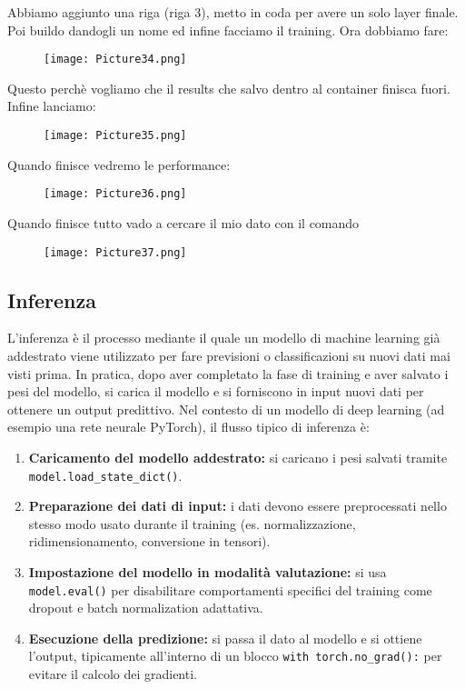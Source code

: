 \documentclass[a4paper,12pt]{article}
\begin{document}
\noindent Abbiamo aggiunto una riga (riga 3), metto in coda per avere un solo layer finale. 
Poi buildo dandogli un nome ed infine facciamo il training. 
\newline
Ora dobbiamo fare:
\begin{figure}[H]
    \centering
    \texttt{[image: Picture34.png]}
\end{figure}
\noindent Questo perchè vogliamo che il results che salvo dentro al container finisca fuori. Infine lanciamo:
\begin{figure}[H]
    \centering
    \texttt{[image: Picture35.png]}
\end{figure}
\noindent Quando finisce vedremo le performance: 
\begin{figure}[H]
    \centering
    \texttt{[image: Picture36.png]}
\end{figure}
Quando finisce tutto vado a cercare il mio dato con il comando 
\begin{figure}[H]
    \centering
    \texttt{[image: Picture37.png]}
\end{figure}

\subsection{Inferenza}
L'inferenza è il processo mediante il quale un modello di machine learning già addestrato viene utilizzato per fare previsioni o classificazioni su nuovi dati mai visti prima. In pratica, dopo aver completato la fase di training e aver salvato i pesi del modello, si carica il modello e si forniscono in input nuovi dati per ottenere un output predittivo.
\newline
Nel contesto di un modello di deep learning (ad esempio una rete neurale PyTorch), il flusso tipico di inferenza è:

\begin{enumerate}
    \item \textbf{Caricamento del modello addestrato:} si caricano i pesi salvati tramite \texttt{model.load\_state\_dict()}.
    \item \textbf{Preparazione dei dati di input:} i dati devono essere preprocessati nello stesso modo usato durante il training (es. normalizzazione, ridimensionamento, conversione in tensori).
    \item \textbf{Impostazione del modello in modalità valutazione:} si usa \texttt{model.eval()} per disabilitare comportamenti specifici del training come dropout e batch normalization adattativa.
    \item \textbf{Esecuzione della predizione:} si passa il dato al modello e si ottiene l'output, tipicamente all'interno di un blocco \texttt{with torch.no\_grad():} per evitare il calcolo dei gradienti.
\end{enumerate}
\end{document}
